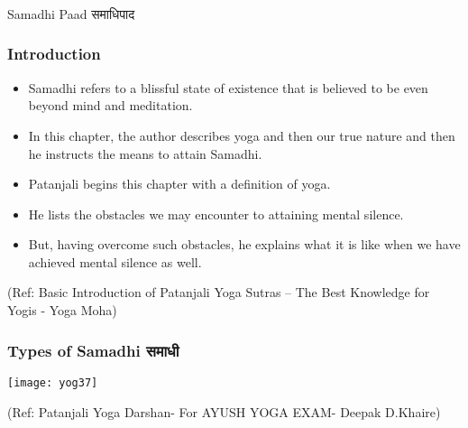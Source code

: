 \begin{frame}[fragile]\frametitle{}
\begin{center}
{\Large Samadhi Paad समाधिपाद}
\end{center}
\end{frame}


\begin{frame}[fragile]\frametitle{Introduction}


	\begin{itemize}
	\item Samadhi refers to a blissful state of existence that is believed to be even beyond mind and meditation.
	\item In this chapter, the author describes yoga and then our true nature and then he instructs the means to attain Samadhi. 
	\item Patanjali begins this chapter with a definition of yoga.
	\item He lists the obstacles we may encounter to attaining mental silence. 
	\item But, having overcome such obstacles, he explains what it is like when we have achieved mental silence as well.
	\end{itemize}

\tiny{(Ref: Basic Introduction of Patanjali Yoga Sutras – The Best Knowledge for Yogis - Yoga Moha)}

\end{frame}

\begin{frame}[fragile]\frametitle{Types of Samadhi समाधी}

\begin{center}
\texttt{[image: yog37]}

\end{center}

  
  \tiny{(Ref: Patanjali Yoga Darshan- For AYUSH YOGA EXAM- Deepak D.Khaire)}

\end{frame}


